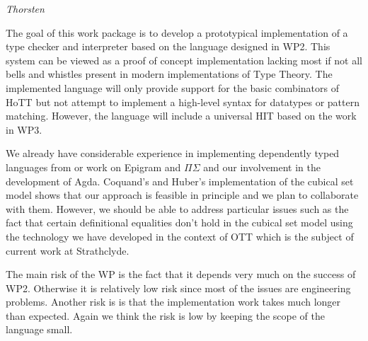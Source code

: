 \documentclass[twocolumn,a4paper,11pt]{article}
\begin{document}
\emph{Thorsten}

The goal of this work package is to develop a prototypical
implementation of a type checker and interpreter based on the language
designed in WP2. This system can be viewed as a proof of concept
implementation lacking most if not all bells and whistles present in
modern implementations of Type Theory. The implemented language will
only provide support for the basic combinators of HoTT but not attempt
to implement a high-level syntax for datatypes or pattern
matching. However, the language will include a universal HIT based on
the work in WP3. 

We already have considerable experience in implementing dependently
typed languages from or work on Epigram and $\Pi\Sigma$ and our
involvement in the development of Agda. Coquand's and Huber's
implementation of the cubical set model shows that our approach is
feasible in principle and we plan to collaborate with them. However,
we should be able to address particular issues such as the fact that
certain definitional equalities don't hold in the cubical set model
using the technology we have developed in the context of OTT
\cite{alti:ott-conf} which is the subject of current work at
Strathclyde. 

The main risk of the WP is the fact that it depends very much on the
success of WP2. Otherwise it is relatively low risk since most of the
issues are engineering problems. Another risk is is that the
implementation work takes much longer than expected. Again we think the
risk is low by keeping the scope of the language small.


\end{document}
